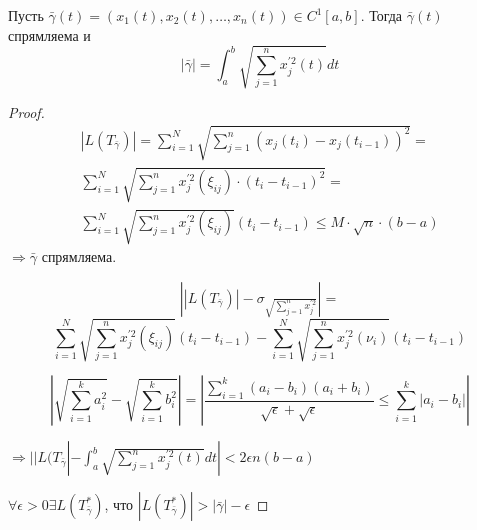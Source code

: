 \begin{theorem}
    Пусть $\bar{\gamma}(t) = (x_1(t), x_2(t), \dots, x_n(t)) \in C^1[a,b]$. Тогда $\bar{\gamma}(t)$ спрямляема и $$|\bar{\gamma}| = \int_{a}^{b} \sqrt{\sum_{j = 1}^{n} x_j^{'2}(t)} dt$$
\end{theorem}
\begin{proof}
    \begin{multline*}
        |L(T_{\bar{\gamma}})| = \sum_{i = 1}^{N} \sqrt{ \sum_{j = 1}^{n}(x_j(t_i) - x_j(t_{i - 1}))^2} =\\ \sum_{i = 1}^{N} \sqrt{\sum_{j = 1}^{n} x_j^{'2}(\xi_{ij}) \cdot (t_i - t_{i - 1})^2} =\\ \sum_{i = 1}^{N} \sqrt{\sum_{j = 1}^{n} x_j^{'2} (\xi_{ij})} (t_i - t_{i - 1}) \leqslant M \cdot \sqrt{n} \cdot (b - a)
    \end{multline*}
    $\Longrightarrow \bar{\gamma}$ спрямляема.
    
        \[\left| |L(T_{\bar{\gamma}})| - \sigma_{\sqrt{\sum_{j = 1}^{n} x_j^{'2}}}\right| = \]
        \[\sum_{i = 1}^{N} \sqrt{\sum_{j = 1}^{n} x_j^{'2} (\xi_{ij})} (t_i - t_{i - 1}) - \sum_{i = 1}^{N} \sqrt{\sum_{j = 1}^{n} x_j^{'2} (\nu_{i})}(t_i - t_{i - 1})\]

        \[
        \left|
            \sqrt{\sum_{i = 1}^{k} a_i^2} - \sqrt{\sum_{i = 1}^{k} b_i^2}
        \right| = \left|
            \frac{\sum_{i = 1}^{k} (a_i - b_i) (a_i + b_i)}{\sqrt{\epsilon} + \sqrt{\epsilon}} \leqslant \sum_{i = 1}^{k} |a_i - b_i|
        \right|
        \]

        $\Rightarrow | |L(T_{\bar{\gamma}}| - \int_{a}^{b} \sqrt{\sum_{j = 1}^{n} x_{j}^{'2}(t)} dt | < 2 \epsilon n (b-a)$

    $\forall \epsilon > 0 \exists L(T^{*}_{\bar{\gamma}})$, что $|L(T^{*}_{\bar{\gamma}}) | > |\bar{\gamma}| - \epsilon$
\end{proof}